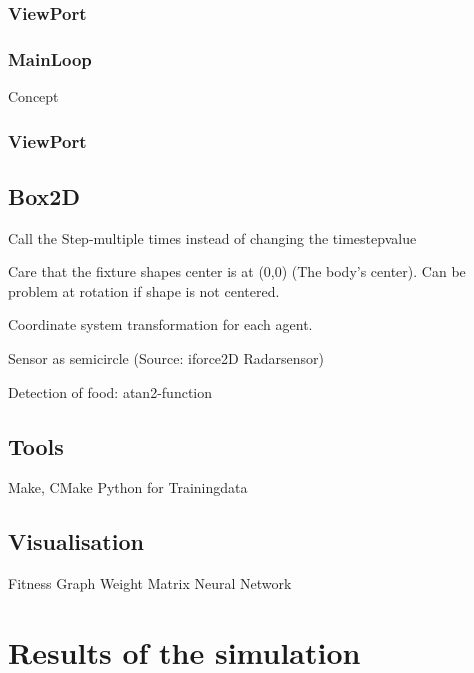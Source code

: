 \documentclass[10pt,a4paper,DIV=11]{scrreprt}
\begin{document}
\subsection{ViewPort}

\subsection{MainLoop}

Concept

\subsection{ViewPort}

\section{Box2D}

Call the Step-multiple times instead of changing the timestepvalue

Care that the fixture shapes center is at (0,0) (The body's center). Can be problem at rotation if shape is not centered.

Coordinate system transformation for each agent.

Sensor as semicircle (Source: iforce2D Radarsensor)

Detection of food: atan2-function

\section{Tools}
Make, CMake
Python for Trainingdata

\section{Visualisation}

Fitness Graph
Weight Matrix
Neural Network






\chapter{Results of the simulation}
\end{document}
